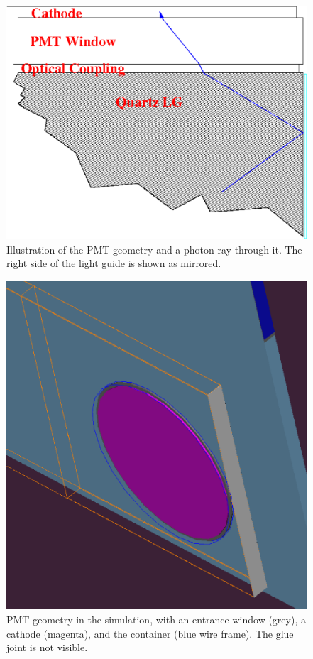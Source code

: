 \begin{figure}[h]
  \hspace{2cm}
  \includegraphics[scale=0.4]{./figures5/LightCountGeom.eps}
  \caption{Illustration of the PMT geometry and a photon ray through it.
           The right side of the light guide is shown as mirrored.}\label{fig:PMTGEO}
\end{figure}

\begin{figure}[h]
  \hspace{3cm}
  \includegraphics[scale=0.4]{./figures5/PMTGeometry.eps}
  \caption{PMT geometry in the simulation, with an entrance window (grey),
           a cathode (magenta), and the container (blue wire frame). The
           glue joint is not visible.}\label{fig:PMTGEO2}
\end{figure}



